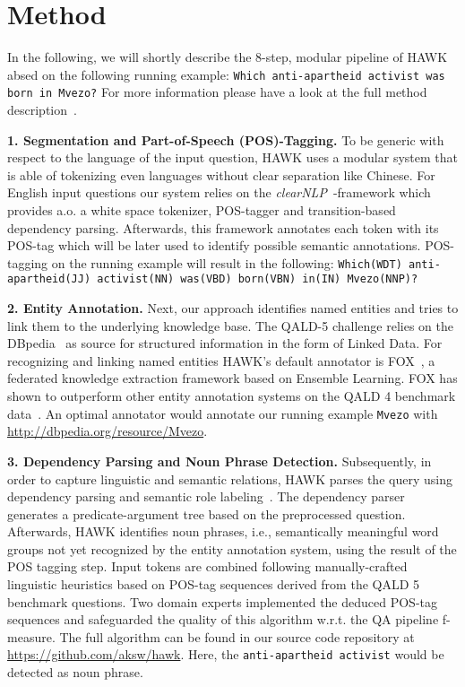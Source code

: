 \documentclass{llncs}
\begin{document}
\section{Method}
\label{sec:method}

In the following, we will shortly describe the 8-step, modular pipeline of HAWK absed on the following running example: \texttt{Which anti-apartheid activist was born in Mvezo?}
For more information please have a look at the full method description~\cite{HAWK_2015}.


\textbf{1. Segmentation and Part-of-Speech (POS)-Tagging.} 
To be generic with respect to the language of the input question, HAWK uses a modular system that is able of tokenizing even languages without clear separation like Chinese.
For English input questions our system relies on the \emph{clearNLP}~\cite{choi2011getting}-framework which provides a.o. a white space tokenizer, POS-tagger and transition-based dependency parsing.
Afterwards, this framework annotates each token with its POS-tag which will be later used to identify possible semantic annotations. 
POS-tagging on the running example will result in the following: \texttt{Which(WDT) anti-apartheid(JJ) activist(NN) was(VBD) born(VBN) in(IN) Mvezo(NNP)?}

\textbf{2. Entity Annotation.} 
Next, our approach identifies named entities and tries to link them to the underlying knowledge base. 
The QALD-5 challenge relies on the DBpedia~\cite{jl_2014/swj_dbpedia} as source for structured information in the form of Linked Data. 
For recognizing and linking named entities HAWK's default annotator is FOX~\cite{FOX}, a federated knowledge extraction framework based on Ensemble Learning. 
FOX has shown to outperform other entity annotation systems on the QALD 4 benchmark data~\cite{HAWK_2015}.
An optimal annotator would annotate our running example \texttt{Mvezo} with \url{http://dbpedia.org/resource/Mvezo}.

\textbf{3. Dependency Parsing and Noun Phrase Detection.}
Subsequently, in order to capture linguistic and semantic relations, HAWK parses the query using dependency parsing and semantic role labeling~\cite{choi2011getting}.
The dependency parser generates a predicate-argument tree based on the preprocessed question.
Afterwards, HAWK identifies noun phrases, i.e., semantically meaningful word groups not yet recognized by the entity annotation system, using the result of the POS tagging step. 
Input tokens are combined following manually-crafted linguistic heuristics based on POS-tag sequences derived from the QALD 5 benchmark questions. %
Two domain experts implemented the deduced POS-tag sequences and safeguarded the quality of this algorithm w.r.t. the QA pipeline f-measure. 
The full algorithm can be found in our source code repository at \url{https://github.com/aksw/hawk}.
Here, the \texttt{anti-apartheid activist} would be detected as noun phrase.
\end{document}
